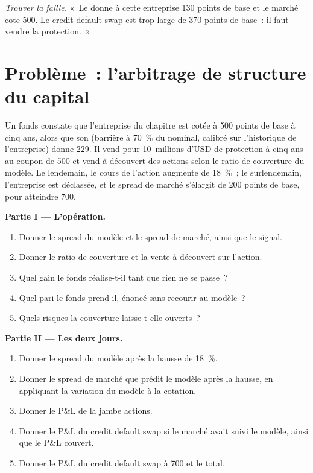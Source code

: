 \begin{exercise}[$\star\star\star$]\label{exo:rc:structural-credit-models:8}
\emph{Trouver la faille.} «~Le  donne à cette entreprise 130 points de base et le marché
cote 500. Le credit default swap est trop large de 370 points de base~: il faut vendre la protection.~»
\end{exercise}

\section{Problème~: l'arbitrage de structure du capital}

\begin{problem}\label{pb:rc:structural-credit-models:1}
Un fonds constate que l'entreprise du chapitre est cotée à 500 points de base à cinq ans, alors que son
 (barrière à 70~\% du nominal, calibré sur l'historique de l'entreprise) donne 229. Il
vend pour 10~millions d'USD de protection à cinq ans au coupon de 500 et vend à découvert des actions selon le
ratio de couverture du modèle. Le lendemain, le cours de l'action augmente de 18~\%~; le surlendemain, l'entreprise est
déclassée, et le spread de marché s'élargit de 200 points de base, pour atteindre 700.

\medskip\noindent\textbf{Partie I --- L'opération.}
\begin{enumerate}
\item Donner le spread du modèle et le spread de marché, ainsi que le signal.
\item Donner le ratio de couverture et la vente à découvert sur l'action.
\item Quel gain le fonds réalise-t-il tant que rien ne se passe~?
\item Quel pari le fonds prend-il, énoncé sans recourir au modèle~?
\item Quels risques la couverture laisse-t-elle ouverts~?
\end{enumerate}

\medskip\noindent\textbf{Partie II --- Les deux jours.}
\begin{enumerate}[resume]
\item Donner le spread du modèle après la hausse de 18~\%.
\item Donner le spread de marché que prédit le modèle après la hausse, en appliquant
la variation du modèle à la cotation.
\item Donner le P\&L de la jambe actions.
\item Donner le P\&L du credit default swap si le marché avait suivi le modèle, ainsi que le P\&L couvert.
\item Donner le P\&L du credit default swap à 700 et le total.
\end{enumerate}


\end{problem}
